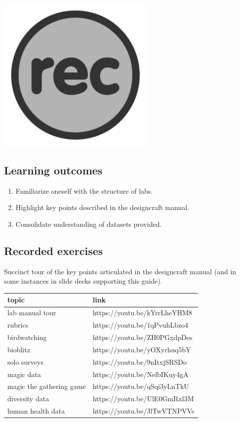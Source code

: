 \documentclass[
]{book}
\providecommand{\tightlist}{%
  \setlength{\itemsep}{0pt}\setlength{\parskip}{0pt}}
\begin{document}
\includegraphics[width=3in,height=\textheight]{./rec.png}

\hypertarget{learning-outcomes-6}{%
\subsection*{Learning outcomes}\label{learning-outcomes-6}}

\begin{enumerate}
\def\labelenumi{\arabic{enumi}.}
\tightlist
\item
  Familiarize oneself with the structure of labs.\\
\item
  Highlight key points described in the designcraft manual.\\
\item
  Consolidate understanding of datasets provided.
\end{enumerate}

\hypertarget{recorded-exercises}{%
\subsection*{Recorded exercises}\label{recorded-exercises}}

Succinct tour of the key points articulated in the designcraft manual (and in some instances in slide decks supporting this guide).

\begin{tabular}{ll}
\toprule
topic & link\\
\midrule
lab manual tour & https://youtu.be/kYrrLheYHM8\\
rubrics & https://youtu.be/1qPvuhLbzo4\\
birdwatching & https://youtu.be/ZH0PGxdpDes\\
bioblitz & https://youtu.be/yOXyrhuq5bY\\
solo surveys & https://youtu.be/9nItxjSRSDo\\
\addlinespace
magic data & https://youtu.be/NelbIKuy4gA\\
magic the gathering game & https://youtu.be/qSqi3yLnTkU\\
diversity data & https://youtu.be/UlE0GmRxl3M\\
human health data & https://youtu.be/JlTwVTNPVVc\\
\bottomrule
\end{tabular}

  
\end{document}
